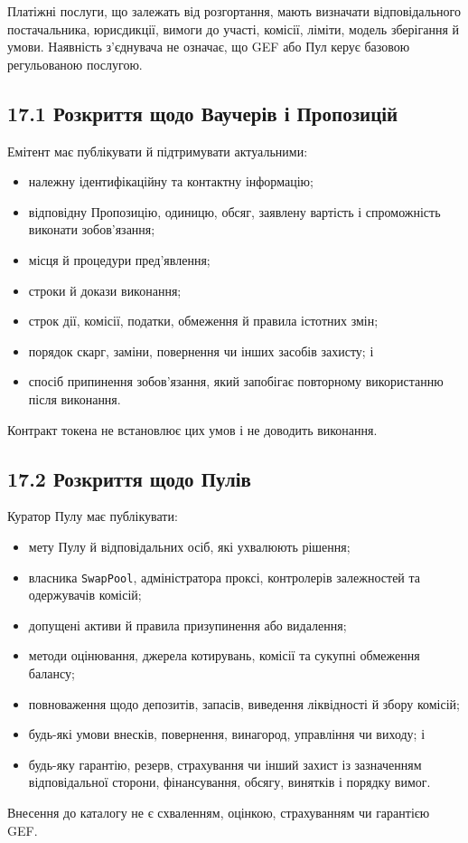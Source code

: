 \documentclass[11pt]{article}
\begin{document}
Платіжні послуги, що залежать від розгортання, мають визначати відповідального постачальника, юрисдикції, вимоги до участі, комісії, ліміти, модель зберігання й умови. Наявність з'єднувача не означає, що GEF або Пул керує базовою регульованою послугою.

\subsection*{17.1 Розкриття щодо Ваучерів і Пропозицій}

Емітент має публікувати й підтримувати актуальними:

\begin{itemize}[leftmargin=*]
\item належну ідентифікаційну та контактну інформацію;
\item відповідну Пропозицію, одиницю, обсяг, заявлену вартість і спроможність виконати зобов'язання;
\item місця й процедури пред'явлення;
\item строки й докази виконання;
\item строк дії, комісії, податки, обмеження й правила істотних змін;
\item порядок скарг, заміни, повернення чи інших засобів захисту; і
\item спосіб припинення зобов'язання, який запобігає повторному використанню після виконання.
\end{itemize}
Контракт токена не встановлює цих умов і не доводить виконання.

\subsection*{17.2 Розкриття щодо Пулів}

Куратор Пулу має публікувати:

\begin{itemize}[leftmargin=*]
\item мету Пулу й відповідальних осіб, які ухвалюють рішення;
\item власника \texttt{SwapPool}, адміністратора проксі, контролерів залежностей та одержувачів комісій;
\item допущені активи й правила призупинення або видалення;
\item методи оцінювання, джерела котирувань, комісії та сукупні обмеження балансу;
\item повноваження щодо депозитів, запасів, виведення ліквідності й збору комісій;
\item будь-які умови внесків, повернення, винагород, управління чи виходу; і
\item будь-яку гарантію, резерв, страхування чи інший захист із зазначенням відповідальної сторони, фінансування, обсягу, винятків і порядку вимог.
\end{itemize}
Внесення до каталогу не є схваленням, оцінкою, страхуванням чи гарантією GEF.
\end{document}
